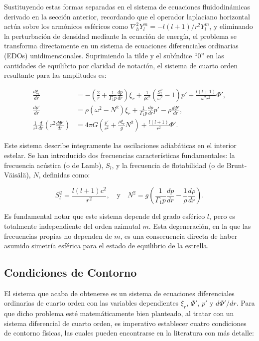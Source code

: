 Sustituyendo estas formas separadas en el sistema de ecuaciones fluidodinámicas derivado en la sección anterior, recordando que el operador laplaciano horizontal actúa sobre los armónicos esféricos como $\nabla_h^2 Y_l^m = -l(l+1)/r^2 Y_l^m$, y eliminando la perturbación de densidad mediante la ecuación de energía, el problema se transforma directamente en un sistema de ecuaciones diferenciales ordinarias (EDOs) unidimensionales. Suprimiendo la tilde y el subíndice ``$0$'' en las cantidades de equilibrio por claridad de notación, el sistema de cuarto orden resultante para las amplitudes es:

\begin{align}
\frac{d\xi_r}{dr} &= -\left(\frac{2}{r}+\frac{1}{\Gamma_1 p}\frac{dp}{dr}\right)\xi_r + \frac{1}{\rho c^2}\left(\frac{S_l^2}{\omega^2}-1\right) p' + \frac{l(l+1)}{\omega^2 r^2} \Phi', \\
\frac{dp'}{dr} &= \rho(\omega^2 - N^2)\xi_r + \frac{1}{\Gamma_1 p}\frac{dp}{dr}p' - \rho \frac{d\Phi'}{dr}, \\
\frac{1}{r^2}\frac{d}{dr} \left(r^2\frac{d\Phi'}{dr}\right) &= 4\pi G\left( \frac{p'}{c^2} + \frac{\rho \xi_r}{g} N^2\right) + \frac{l(l+1)}{r^2} \Phi'.
\end{align}

Este sistema describe íntegramente las oscilaciones adiabáticas en el interior estelar. Se han introducido dos frecuencias características fundamentales: la frecuencia acústica (o de Lamb), $S_l$, y la frecuencia de flotabilidad (o de Brunt-Väisälä), $N$, definidas como:

\begin{equation}
S_l^2 = \frac{l(l+1)c^2}{r^2}, \quad \text{y} \quad N^2 = g\left(\frac{1}{\Gamma_1 p}\frac{dp}{dr} - \frac{1}{\rho}\frac{d\rho}{dr} \right).
\end{equation}

Es fundamental notar que este sistema depende del grado esférico $l$, pero es totalmente independiente del orden azimutal $m$. Esta degeneración, en la que las frecuencias propias no dependen de $m$, es una consecuencia directa de haber asumido simetría esférica para el estado de equilibrio de la estrella.

\subsection{Condiciones de Contorno}

El sistema que acaba de obtenerse es un sistema de ecuaciones diferenciales ordinarias de cuarto orden con las variables dependientes $\xi_r$, $\Phi'$, $p'$ y $d\Phi'/dr$. Para que dicho problema esté matemáticamente bien planteado, al tratar con un sistema diferencial de cuarto orden, es imperativo establecer cuatro condiciones de contorno físicas, las cuales pueden encontrarse en la literatura con más detalle:

